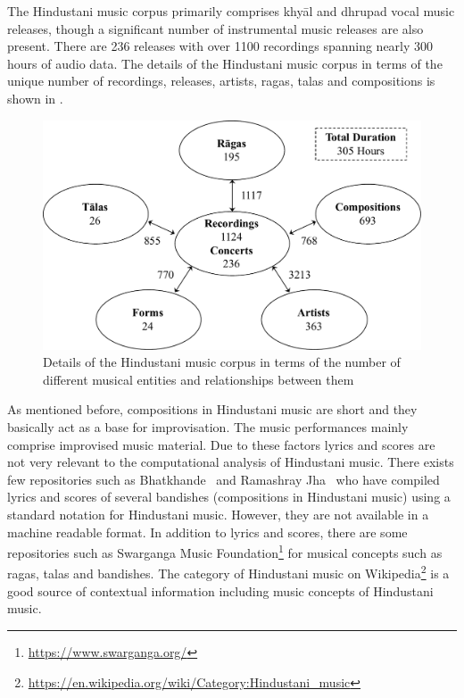 The Hindustani music corpus primarily comprises khy\={a}l and dhrupad vocal music releases, though a significant number of instrumental music releases are also present. There are 236 releases with over 1100 recordings spanning nearly 300 hours of audio data. The details of the Hindustani music corpus in terms of the unique number of recordings, releases, artists, \glspl{raga}, \glspl{tala} and compositions is shown in .


\begin{figure}
	\begin{center}
		\includegraphics[width=\figSizeNinety]{ch04_datasets/figures/hindustani_corpus_main.pdf}
	\end{center}
	\caption[Details of the Hindustani music corpus]{Details of the Hindustani music corpus in terms of the number of different musical entities and relationships between them}
	\label{fig:hindustani_corpus_details}
\end{figure}


As mentioned before, compositions in Hindustani music are short and they basically act as a base for improvisation. The music performances mainly comprise improvised music material. Due to these factors lyrics and scores are not very relevant to the computational analysis of Hindustani music. There exists few repositories such as Bhatkhande~\citep{Bhatkhande_1990} and Ramashray Jha~\citep{R_Jha_2001} who have compiled lyrics and scores of several bandishes (compositions in Hindustani music) using a standard notation for Hindustani music. However, they are not available in a machine readable format. In addition to lyrics and scores, there are some repositories such as Swarganga Music Foundation\footnote{\url{https://www.swarganga.org/}} for musical concepts such as \glspl{raga}, \glspl{tala} and bandishes. The category of Hindustani music on Wikipedia\footnote{\url{https://en.wikipedia.org/wiki/Category:Hindustani_music}} is a good source of contextual information including music concepts of Hindustani music.


